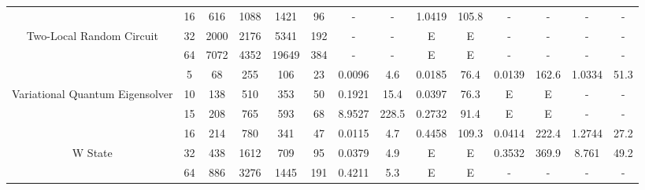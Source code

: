 \begin{table}[htb]
{\begin{tabular}{|c|c|c|c|c|c|c|c|c|c|c|c|c|c|}
\hline
 & 
16 & 616 & 1088 & 1421 & 96
 & - & -
 & 1.0419 & 105.8
 & - & -
 & - & -
 \\
Two-Local Random Circuit & 
32 & 2000 & 2176 & 5341 & 192
 & - & -
 & E & E
 & - & -
 & - & -
 \\
 & 
64 & 7072 & 4352 & 19649 & 384
 & - & -
 & E & E
 & - & -
 & - & -
 \\
\hline
 & 
5 & 68 & 255 & 106 & 23
 & 0.0096 & 4.6
 & 0.0185 & 76.4
 & 0.0139 & 162.6
 & 1.0334 & 51.3
 \\
Variational Quantum Eigensolver & 
10 & 138 & 510 & 353 & 50
 & 0.1921 & 15.4
 & 0.0397 & 76.3
 & E & E
 & - & -
 \\
 & 
15 & 208 & 765 & 593 & 68
 & 8.9527 & 228.5
 & 0.2732 & 91.4
 & E & E
 & - & -
 \\
\hline
 & 
16 & 214 & 780 & 341 & 47
 & 0.0115 & 4.7
 & 0.4458 & 109.3
 & 0.0414 & 222.4
 & 1.2744 & 27.2
 \\
W State & 
32 & 438 & 1612 & 709 & 95
 & 0.0379 & 4.9
 & E & E
 & 0.3532 & 369.9
 & 8.761 & 49.2
 \\
 & 
64 & 886 & 3276 & 1445 & 191
 & 0.4211 & 5.3
 & E & E
 & - & -
 & - & -
 \\
\hline
\end{tabular}}
\end{table}